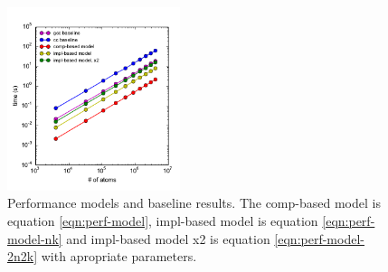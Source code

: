 \documentclass[12pt]{article}
\begin{document}
\begin{figure}[h!]
  \centering
  \includegraphics[width=0.45\textwidth]{../figs/compiler_forceLJ.pdf}
  \caption{Performance models and baseline results.  The comp-based
    model is equation \ref{eqn:perf-model}, impl-based model is
    equation \ref{eqn:perf-model-nk} and impl-based model x2 is
    equation \ref{eqn:perf-model-2n2k} with apropriate parameters.}
  \label{fig:perf-models}
\end{figure}
\end{document}
